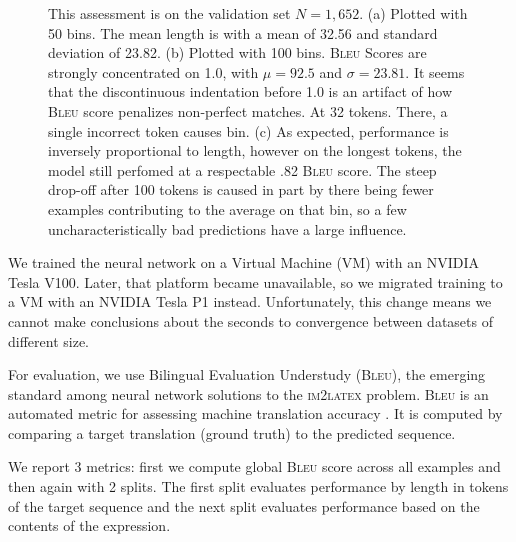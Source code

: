 \documentclass[12pt]{article}
\newcommand{\BLEU}{\textsc{Bleu}}
\begin{document}
\begin{figure}[h]
\begin{subfigure}{1.0\textwidth}
		\caption{}
	\end{subfigure}
  \caption[Model]{This assessment is on the validation set $N=1,652$. (a)
  Plotted with 50 bins. The mean length is with a mean of  32.56 and standard
  deviation of 23.82. (b) Plotted with 100 bins. \BLEU{} Scores are strongly
  concentrated on 1.0, with $\mu = 92.5$ and $\sigma = 23.81$. It seems that the
  discontinuous indentation before 1.0 is an artifact of how \BLEU{} score
  penalizes non-perfect matches. At 32 tokens. There, a single incorrect token
  causes bin. (c) As expected, performance is inversely proportional to length,
  however on the longest tokens, the model still perfomed at a respectable .82
  \BLEU{} score. The steep drop-off after 100 tokens is caused in part by there
  being fewer examples contributing to the average on that bin, so a few
  uncharacteristically bad predictions have a large influence.} 
\end{figure}

We trained the neural network on a Virtual Machine (VM) with an NVIDIA Tesla
V100. Later, that platform became unavailable, so we migrated training to a VM
with an NVIDIA Tesla P1 instead. Unfortunately, this change means we cannot make
conclusions about the seconds to convergence between datasets of different size.

For evaluation, we use Bilingual Evaluation Understudy (\BLEU{}), the emerging
standard among neural network solutions to the \textsc{im2latex} problem. \BLEU{}
is an automated metric for assessing machine translation accuracy
\cite[1]{papineni2002bleu}. It is computed by comparing a target translation
(ground truth) to the predicted sequence.

We report 3 metrics: first we compute global \BLEU{} score across all examples and
then again with 2 splits. The first split evaluates performance by length in
tokens of the target sequence and the next split evaluates performance based on
the contents of the expression.
\end{document}
